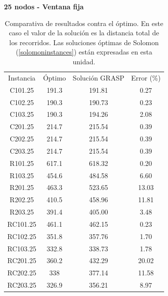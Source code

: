 \documentclass{article}
\begin{document}
  \begin{table}[h!]
    \centering
    \caption*{{\bf 25 nodos - Ventana fija}}
    \begin{tabular}{cccc}
      \toprule
      Instancia & Óptimo & Solución GRASP & Error (\%) \\
      C101.25  & 191.3 & 191.81 &  0.27 \\
      C102.25  & 190.3 & 190.73 &  0.23 \\
      C103.25  & 190.3 & 194.26 &  2.08 \\
      C201.25  & 214.7 & 215.54 &  0.39 \\
      C202.25  & 214.7 & 215.54 &  0.39 \\
      C203.25  & 214.7 & 215.54 &  0.39 \\
      R101.25  & 617.1 & 618.32 &  0.20 \\
      R103.25  & 454.6 & 484.58 &  6.60 \\
      R201.25  & 463.3 & 523.65 &  13.03 \\
      R202.25  & 410.5 & 458.96 &  11.81 \\
      R203.25  & 391.4 & 405.00 &  3.48 \\
      RC101.25 & 461.1 & 462.15 &  0.23 \\
      RC102.25 & 351.8 & 357.76 &  1.70 \\
      RC103.25 & 332.8 & 338.73 &  1.78 \\
      RC201.25 & 360.2 & 432.29 &  20.02 \\
      RC202.25 & 338   & 377.14 &  11.58 \\
      RC203.25 & 326.9 & 356.21 &  8.97 \\
      \midrule
      \bottomrule
    \end{tabular}
    \caption{Comparativa de resultados contra el óptimo. En este caso el valor de la solución es la distancia total de los recorridos. Las soluciones óptimas de Solomon (\ref{solomoninstances}) están expresadas en esta unidad.}\label{table:res25nodesfixed}
  \end{table}
\end{document}
